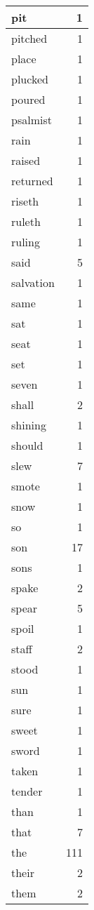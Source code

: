 \begin{center}
\begin{longtable}{l|r}
pit & 1 \\ \hline
pitched & 1 \\ \hline
place & 1 \\ \hline
plucked & 1 \\ \hline
poured & 1 \\ \hline
psalmist & 1 \\ \hline
rain & 1 \\ \hline
raised & 1 \\ \hline
returned & 1 \\ \hline
riseth & 1 \\ \hline
ruleth & 1 \\ \hline
ruling & 1 \\ \hline
said & 5 \\ \hline
salvation & 1 \\ \hline
same & 1 \\ \hline
sat & 1 \\ \hline
seat & 1 \\ \hline
set & 1 \\ \hline
seven & 1 \\ \hline
shall & 2 \\ \hline
shining & 1 \\ \hline
should & 1 \\ \hline
slew & 7 \\ \hline
smote & 1 \\ \hline
snow & 1 \\ \hline
so & 1 \\ \hline
son & 17 \\ \hline
sons & 1 \\ \hline
spake & 2 \\ \hline
spear & 5 \\ \hline
spoil & 1 \\ \hline
staff & 2 \\ \hline
stood & 1 \\ \hline
sun & 1 \\ \hline
sure & 1 \\ \hline
sweet & 1 \\ \hline
sword & 1 \\ \hline
taken & 1 \\ \hline
tender & 1 \\ \hline
than & 1 \\ \hline
that & 7 \\ \hline
the & 111 \\ \hline
their & 2 \\ \hline
them & 2 \\ \hline

\end{longtable}
\end{center}
